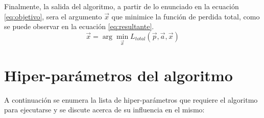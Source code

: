 \documentclass[a4paper,11pt,spanish]{book}
\begin{document}
      Finalmente, la salida del algoritmo, a partir de lo enunciado en la ecuación \eqref{eq:objetivo}, sera el argumento $\overrightarrow{x}$
      que minimice la función de perdida total, como se puede observar en la ecuación \eqref{eq:resultante}. 
      \begin{equation} \label{eq:resultante}
       \overrightarrow{x} = \arg\min_{\overrightarrow{x}} L_{total}(\overrightarrow{p},\overrightarrow{a},\overrightarrow{x})
      \end{equation}
      
      \section{Hiper-parámetros del algoritmo} \label{sec:hiperparametros}
	A continuación se enumera la lista de hiper-parámetros que requiere el algoritmo para ejecutarse y se discute acerca de su influencia en el mismo:
\end{document}
